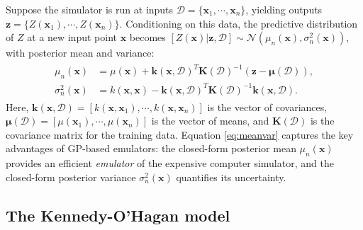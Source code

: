 \documentclass[12pt]{article}
\newcommand{\bs}[1]{\boldsymbol{#1}}
\begin{document}
Suppose the simulator is run at inputs $\mathcal{D}=\{\bs{x}_1, \cdots, \bs{x}_n\}$, yielding outputs $\bs{z} = \{Z(\bs{x}_1),\cdots,Z(\bs{x}_n)\}$. Conditioning on this data, the predictive distribution of $Z$ at a new input point $\bs{x}$ becomes $[Z(\bs{x})|\bs{z},\mathcal{D}] \sim \mathcal{N}(\mu_n(\bs{x}),\sigma^2_n(\bs{x}))$, with posterior mean and variance:
\begin{align}
\label{eq:meanvar}
\begin{split}
\mu_n(\bs{x}) &= \mu(\bs{x}) + \bs{k}(\bs{x},\mathcal{D})^T\bs{K}(\mathcal{D})^{-1}(\bs{z}-\bs{\mu}(\mathcal{D})),\\
\sigma^2_n(\bs{x}) &= k(\bs{x},\bs{x})-\bs{k}(\bs{x},\mathcal{D})^T\bs{K}(\mathcal{D})^{-1}\bs{k}(\bs{x},\mathcal{D}).
\end{split}
\end{align}
Here, $\bs{k}(\bs{x},\mathcal{D})=[k(\bs{x},\bs{x}_1),\cdots,k(\bs{x},\bs{x}_n)]$ is the vector of covariances, $\bs{\mu}(\mathcal{D}) = [\mu(\bs{x}_1), \cdots,\allowbreak \mu(\bs{x}_n)]$ is the vector of means, and $\bs{K}(\mathcal{D})$ is the covariance matrix for the training data. Equation \eqref{eq:meanvar} captures the key advantages of GP-based emulators: the closed-form posterior mean $\mu_n(\bs{x})$ provides an efficient \textit{emulator} of the expensive computer simulator, and the closed-form posterior variance $\sigma^2_n(\bs{x})$ quantifies its uncertainty.


\subsection{The Kennedy-O'Hagan model}

\label{sec:ko}
\end{document}
